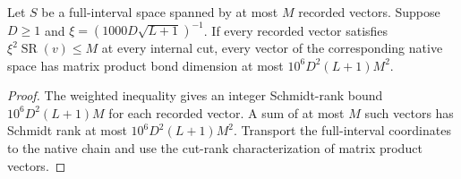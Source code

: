 \begin{lemma}
    \label{lem:full_interval_trim_native_mps}
    \leanok
    Let $S$ be a full-interval space spanned by at most $M$ recorded
    vectors. Suppose $D\ge1$ and
    $\xi=(1000D\sqrt{L+1})^{-1}$. If every recorded vector satisfies
    $\xi^2\operatorname{SR}(v)\le M$ at every internal cut, every vector
    of the corresponding native space has matrix product bond dimension
    at most $10^6D^2(L+1)M^2$.
\end{lemma}
\begin{proof}\leanok
    The weighted inequality gives an integer Schmidt-rank bound
    $10^6D^2(L+1)M$ for each recorded vector. A sum of at most $M$
    such vectors has Schmidt rank at most $10^6D^2(L+1)M^2$.
    Transport the full-interval coordinates to the native chain and use
    the cut-rank characterization of matrix product vectors.
\end{proof}

